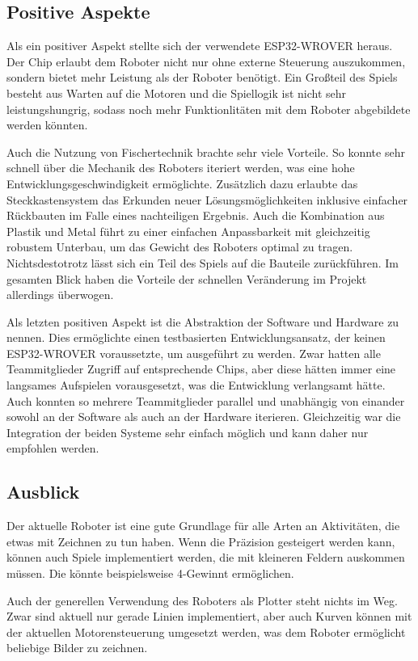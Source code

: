 \documentclass[conference,compsoc,final,a4paper]{IEEEtran}
\begin{document}
\subsection{Positive Aspekte}

Als ein positiver Aspekt stellte sich der verwendete ESP32-WROVER heraus. Der Chip erlaubt dem Roboter nicht nur ohne externe Steuerung
auszukommen, sondern bietet mehr Leistung als der Roboter benötigt. Ein Großteil des Spiels besteht aus Warten auf die Motoren und die
Spiellogik ist nicht sehr leistungshungrig, sodass noch mehr Funktionlitäten mit dem Roboter abgebildete werden könnten.

Auch die Nutzung von Fischertechnik brachte sehr viele Vorteile. So konnte sehr schnell über die Mechanik des Roboters iteriert werden,
was eine hohe Entwicklungsgeschwindigkeit ermöglichte. Zusätzlich dazu erlaubte das Steckkastensystem das Erkunden neuer Lösungsmöglichkeiten
inklusive einfacher Rückbauten im Falle eines nachteiligen Ergebnis. Auch die Kombination aus Plastik und Metal führt zu einer einfachen 
Anpassbarkeit mit gleichzeitig robustem Unterbau, um das Gewicht des Roboters optimal zu tragen. Nichtsdestotrotz lässt sich ein Teil des
Spiels auf die Bauteile zurückführen. Im gesamten Blick haben die Vorteile der schnellen Veränderung im Projekt allerdings überwogen.

Als letzten positiven Aspekt ist die Abstraktion der Software und Hardware zu nennen. Dies ermöglichte einen testbasierten
Entwicklungsansatz, der keinen ESP32-WROVER voraussetzte, um ausgeführt zu werden. Zwar hatten alle Teammitglieder Zugriff auf entsprechende
Chips, aber diese hätten immer eine langsames Aufspielen vorausgesetzt, was die Entwicklung verlangsamt hätte. Auch konnten so mehrere
Teammitglieder parallel und unabhängig von einander sowohl an der Software als auch an der Hardware iterieren. Gleichzeitig war die
Integration der beiden Systeme sehr einfach möglich und kann daher nur empfohlen werden.

\subsection{Ausblick}

Der aktuelle Roboter ist eine gute Grundlage für alle Arten an Aktivitäten, die etwas mit Zeichnen zu tun haben. Wenn die Präzision
gesteigert werden kann, können auch Spiele implementiert werden, die mit kleineren Feldern auskommen müssen. Die könnte beispielsweise
4-Gewinnt ermöglichen.

Auch der generellen Verwendung des Roboters als Plotter steht nichts im Weg. Zwar sind aktuell nur gerade Linien implementiert, aber
auch Kurven können mit der aktuellen Motorensteuerung umgesetzt werden, was dem Roboter ermöglicht beliebige Bilder zu zeichnen.

\printbibliography
\end{document}
